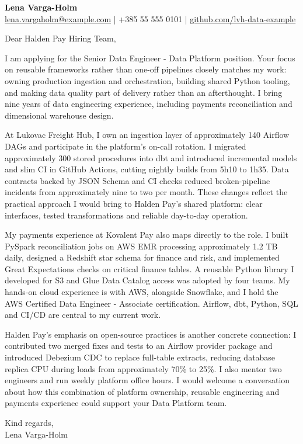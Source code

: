 \documentclass[11pt,a4paper]{article}
\begin{document}
{\large\bfseries\color{primarycolor} Lena Varga-Holm}\\
{\small \href{mailto:lena.vargaholm@example.com}{lena.vargaholm@example.com} | +385 55 555 0101 | \href{https://github.com/lvh-data-example}{github.com/lvh-data-example}}

Dear Halden Pay Hiring Team,

I am applying for the Senior Data Engineer - Data Platform position. Your focus on reusable frameworks rather than one-off pipelines closely matches my work: owning production ingestion and orchestration, building shared Python tooling, and making data quality part of delivery rather than an afterthought. I bring nine years of data engineering experience, including payments reconciliation and dimensional warehouse design.

At Lukovac Freight Hub, I own an ingestion layer of approximately 140 Airflow DAGs and participate in the platform's on-call rotation. I migrated approximately 300 stored procedures into dbt and introduced incremental models and slim CI in GitHub Actions, cutting nightly builds from 5h10 to 1h35. Data contracts backed by JSON Schema and CI checks reduced broken-pipeline incidents from approximately nine to two per month. These changes reflect the practical approach I would bring to Halden Pay's shared platform: clear interfaces, tested transformations and reliable day-to-day operation.

My payments experience at Kovalent Pay also maps directly to the role. I built PySpark reconciliation jobs on AWS EMR processing approximately 1.2 TB daily, designed a Redshift star schema for finance and risk, and implemented Great Expectations checks on critical finance tables. A reusable Python library I developed for S3 and Glue Data Catalog access was adopted by four teams. My hands-on cloud experience is with AWS, alongside Snowflake, and I hold the AWS Certified Data Engineer - Associate certification. Airflow, dbt, Python, SQL and CI/CD are central to my current work.

Halden Pay's emphasis on open-source practices is another concrete connection: I contributed two merged fixes and tests to an Airflow provider package and introduced Debezium CDC to replace full-table extracts, reducing database replica CPU during loads from approximately 70\% to 25\%. I also mentor two engineers and run weekly platform office hours. I would welcome a conversation about how this combination of platform ownership, reusable engineering and payments experience could support your Data Platform team.

Kind regards,\\
Lena Varga-Holm
\end{document}
